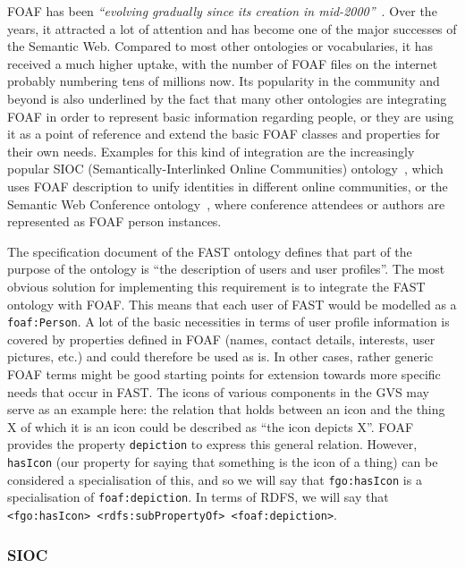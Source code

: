 \documentclass[twoside]{fast_latex}
\begin{document}
FOAF has been \emph{``evolving gradually since its creation in mid-2000''}~\cite{brickley2004foaf}. Over the years, it attracted a lot of attention and has become one of the major successes of the Semantic Web. Compared to most other ontologies or vocabularies, it has received a much higher uptake, with the number of FOAF files on the internet probably numbering tens of millions now. Its popularity in the community and beyond is also underlined by the fact that many other ontologies are integrating FOAF in order to represent basic information regarding people, or they are using it as a point of reference and extend the basic FOAF classes and properties for their own needs. Examples for this kind of integration are the increasingly popular SIOC (Semantically-Interlinked Online Communities) ontology~\cite{breslin2005communitiesEswc}, which uses FOAF description to unify identities in different online communities, or the Semantic Web Conference ontology~\cite{moeller2007dogfood}, where conference attendees or authors are represented as FOAF person instances.

The specification document of the FAST ontology defines that part of the purpose of the ontology is ``the description of users and user profiles''. The most obvious solution for implementing this requirement is to integrate the FAST ontology with FOAF. This means that each user of FAST would be modelled as a \texttt{foaf:Person}. A lot of the basic necessities in terms of user profile information is covered by properties defined in FOAF (names, contact details, interests, user pictures, etc.) and could therefore be used as is. In other cases, rather generic FOAF terms might be good starting points for extension towards more specific needs that occur in FAST. The icons of various components in the GVS may serve as an example here: the relation that holds between an icon and the thing X of which it is an icon could be described as ``the icon depicts X''. FOAF provides the property \texttt{depiction} to express this general relation. However, \texttt{hasIcon} (our property for saying that something is the icon of a thing) can be considered a specialisation of this, and so we will say that \texttt{fgo:hasIcon} is a specialisation of \texttt{foaf:depiction}. In terms of RDFS, we will say that \texttt{<fgo:hasIcon> <rdfs:subPropertyOf> <foaf:depiction>}.

\subsubsection{SIOC} %
\label{ssub:sioc}
\end{document}
